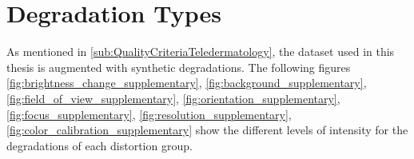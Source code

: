 \chapter{Degradation Types}
\label{ch:Degradation_Types}

As mentioned in \autoref{sub:QualityCriteriaTeledermatology}, the dataset used in this thesis is augmented with synthetic degradations. The following figures
\autoref{fig:brightness_change_supplementary}, 
\autoref{fig:background_supplementary}, 
\autoref{fig:field_of_view_supplementary}, 
\autoref{fig:orientation_supplementary}, 
\autoref{fig:focus_supplementary}, 
\autoref{fig:resolution_supplementary}, 
\autoref{fig:color_calibration_supplementary}
  show the different levels of intensity for the degradations of each distortion group. 
\begin{figure}
    \centering
    \setlength{\tabcolsep}{1pt}
    \Large
\end{figure}

